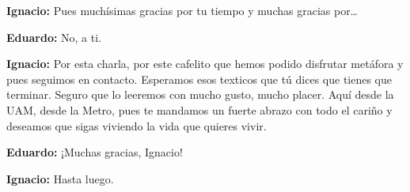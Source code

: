 \documentclass[
]{interact}
\begin{document}
\textbf{Ignacio:} Pues muchísimas gracias por tu tiempo y muchas gracias
por\ldots{}

\textbf{Eduardo:} No, a ti.

\textbf{Ignacio:} Por esta charla, por este cafelito que hemos podido
disfrutar metáfora y pues seguimos en contacto. Esperamos esos texticos
que tú dices que tienes que terminar. Seguro que lo leeremos con mucho
gusto, mucho placer. Aquí desde la UAM, desde la Metro, pues te mandamos
un fuerte abrazo con todo el cariño y deseamos que sigas viviendo la
vida que quieres vivir.

\textbf{Eduardo:} ¡Muchas gracias, Ignacio!

\textbf{Ignacio:} Hasta luego.
\end{document}
